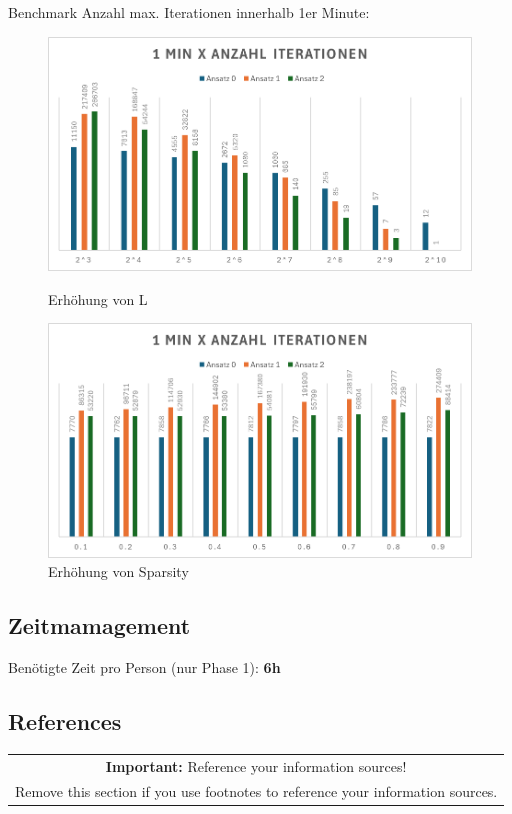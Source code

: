 \documentclass[11pt]{scrartcl}
\begin{document}
Benchmark Anzahl max. Iterationen innerhalb 1er Minute:
\begin{figure}[H]
  \begin{minipage}[b]{.4\linewidth}
    \begin{center}
      \includegraphics[width=\linewidth]{anz_iter_l.png}
      \caption{Erhöhung von L}
    \end{center}
  \end{minipage}
  \hspace{.1\linewidth}
  \begin{minipage}[b]{.4\linewidth}
    \begin{center}
      \includegraphics[width=\linewidth]{anz_iter_spar.png}
      \caption{Erhöhung von Sparsity}
    \end{center}
  \end{minipage}
\end{figure}

\subsection*{Zeitmamagement}

Benötigte Zeit pro Person (nur Phase 1): \textbf{6h}

\subsection*{References}

\begin{table}[H]
  \centering
  \begin{tabular}{c}
    \hline
    \textbf{Important:} Reference your information sources! \tabularnewline
    Remove this section if you use footnotes to reference your information sources. \tabularnewline
    \hline
  \end{tabular}
\end{table}
\end{document}
